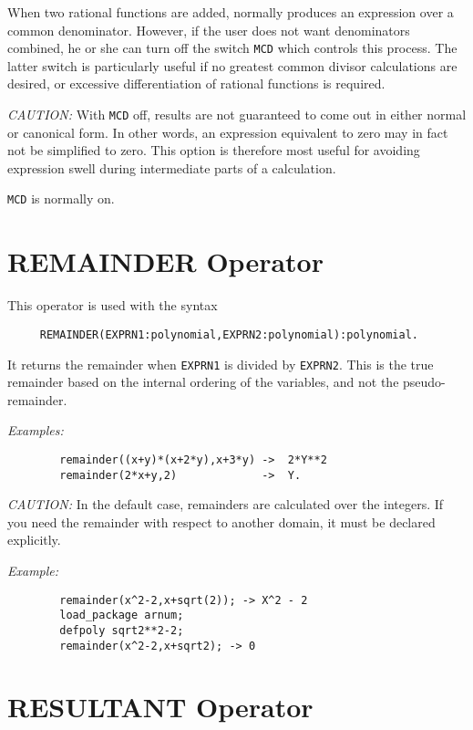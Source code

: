 When two rational functions are added, {\REDUCE} normally produces an
expression over a common denominator. However, if the user does not want
denominators combined, he or she can turn off the switch {\tt MCD}
 which controls this process.  The latter switch is
particularly useful if no greatest common divisor calculations are
desired, or excessive differentiation of rational functions is required.

{\it CAUTION:}  With {\tt MCD} off, results are not guaranteed to come out in
either normal or canonical form.  In other words, an expression equivalent
to zero may in fact not be simplified to zero.  This option is therefore
most useful for avoiding expression swell during intermediate parts of a
calculation.

{\tt MCD} is normally on.

\section{REMAINDER Operator}

This operator is used with the syntax
\begin{verbatim}
     REMAINDER(EXPRN1:polynomial,EXPRN2:polynomial):polynomial.
\end{verbatim}
It returns the remainder when {\tt EXPRN1} is divided by {\tt EXPRN2}.  This
is the true remainder based on the internal ordering of the variables, and
not the pseudo-remainder.

{\it Examples:}
\begin{verbatim}
        remainder((x+y)*(x+2*y),x+3*y) ->  2*Y**2
        remainder(2*x+y,2)             ->  Y.
\end{verbatim}

{\it CAUTION:} In the default case, remainders are calculated over the
integers.  If you need the remainder with respect to another domain, it
must be declared explicitly.

{\it Example:}
\begin{verbatim}
        remainder(x^2-2,x+sqrt(2)); -> X^2 - 2
        load_package arnum;
        defpoly sqrt2**2-2;
        remainder(x^2-2,x+sqrt2); -> 0
\end{verbatim}


\section{RESULTANT Operator}

